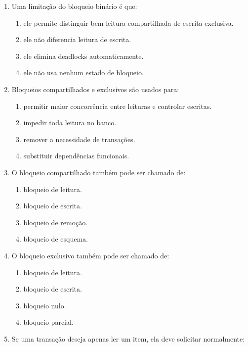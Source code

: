 \documentclass[12pt,a4paper]{article}
\begin{document}
\begin{enumerate}[label=\textbf{Q\arabic*.}]
\item Uma limitação do bloqueio binário é que:

\begin{enumerate}[label=\alph*)]
    \item ele permite distinguir bem leitura compartilhada de escrita exclusiva.
    \item ele não diferencia leitura de escrita.
    \item ele elimina deadlocks automaticamente.
    \item ele não usa nenhum estado de bloqueio.
\end{enumerate}

\item Bloqueios compartilhados e exclusivos são usados para:

\begin{enumerate}[label=\alph*)]
    \item permitir maior concorrência entre leituras e controlar escritas.
    \item impedir toda leitura no banco.
    \item remover a necessidade de transações.
    \item substituir dependências funcionais.
\end{enumerate}

\item O bloqueio compartilhado também pode ser chamado de:

\begin{enumerate}[label=\alph*)]
    \item bloqueio de leitura.
    \item bloqueio de escrita.
    \item bloqueio de remoção.
    \item bloqueio de esquema.
\end{enumerate}

\item O bloqueio exclusivo também pode ser chamado de:

\begin{enumerate}[label=\alph*)]
    \item bloqueio de leitura.
    \item bloqueio de escrita.
    \item bloqueio nulo.
    \item bloqueio parcial.
\end{enumerate}

\item Se uma transação deseja apenas ler um item, ela deve solicitar normalmente:


\end{enumerate}
\end{document}

